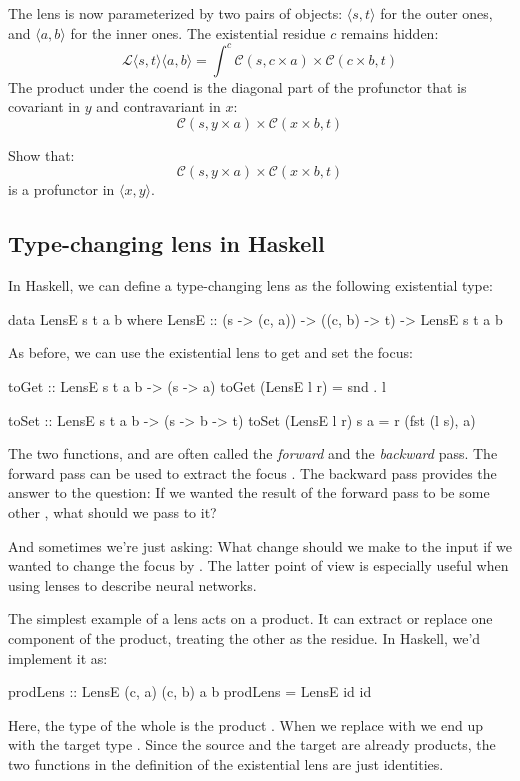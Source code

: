 \documentclass[DaoFP]{subfiles}
\begin{document}
The lens is now parameterized by two pairs of objects: $\langle s, t\rangle$ for the outer ones, and $ \langle a, b \rangle$ for the inner ones. The existential residue $c$ remains hidden:
\[ \mathcal{L}\langle s, t\rangle \langle a, b \rangle = \int^{c} \mathcal{C}(s, c \times a) \times  \mathcal{C}(c \times b, t) \]
The product under the coend is the diagonal part of the profunctor that is covariant in $y$ and contravariant in $x$:
\[ \mathcal{C}(s, y \times a) \times  \mathcal{C}(x \times b, t) \]
\begin{exercise}
Show that:
\[ \mathcal{C}(s, y \times a) \times  \mathcal{C}(x \times b, t) \]
is a profunctor in $\langle x, y\rangle$.
\end{exercise}


\subsection{Type-changing lens in Haskell}
In Haskell, we can define a type-changing lens as the following existential type:
\begin{haskell}
data LensE s t a b where
  LensE :: (s -> (c, a)) -> ((c, b) -> t) -> LensE s t a b
\end{haskell}

As before, we can use the existential lens to get and set the focus:
\begin{haskell}
toGet :: LensE s t a b -> (s -> a)
toGet (LensE l r) = snd . l

toSet :: LensE s t a b -> (s -> b -> t)
toSet (LensE l r) s a = r (fst (l s), a)
\end{haskell}

The two functions,  and  are often called the \emph{forward} and the \emph{backward} pass. 
The forward pass can be used to extract the focus . The backward pass provides the answer to the question: If we wanted the result of the forward pass to be some other , what  should we pass to it? 

And sometimes we're just asking: What change  should we make to the input if we wanted to change the focus by . The latter point of view is especially useful when using lenses to describe neural networks.

The simplest example of a lens acts on a product. It can extract or replace one component of the product, treating the other as the residue. In Haskell, we'd implement it as:
\begin{haskell}
prodLens :: LensE (c, a) (c, b) a b
prodLens = LensE id id
\end{haskell}
Here, the type of the whole is the product . When we replace  with  we end up with the target type . Since the source and the target are already products, the two functions in the definition of the existential lens are just identities.
\end{document}
